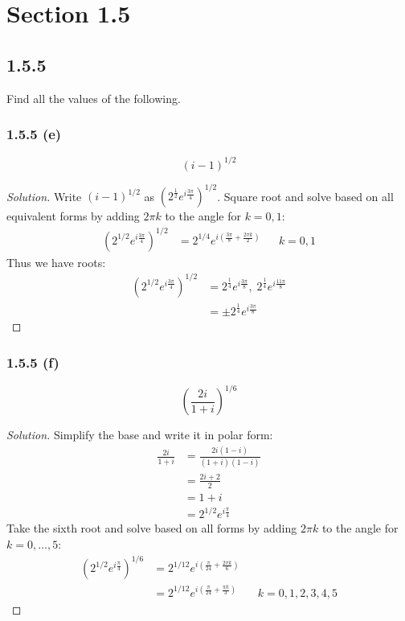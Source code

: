 \documentclass{article}
\newenvironment{solution}{
\begin{proof}[Solution]}{
\end{proof}}
\begin{document}
\section*{Section 1.5}

\subsection*{1.5.5}
Find all the values of the following.

\subsubsection*{1.5.5 (e)}
\[
  (i-1)^{1/2}
\]
\begin{solution}
  Write $(i-1)^{1/2}$ as $\left(2^{\frac{1}{2}}e^{i \frac{3\pi}{4}}\right)^{1/2}$.
  Square root and solve based on all equivalent forms by adding $2\pi k$ to the angle for $k=0,1$:
  \begin{align*}
    \left(2^{1/2} e^{i \frac{3\pi}{4}} \right)^{1/2}
    &= 2^{1/4} e^{i \left(\frac{3\pi}{8} + \frac{2\pi k}{2}\right)}
    && k = 0,1
  \end{align*}
  Thus we have roots:
  \begin{align*}
    \left(2^{1/2} e^{i \frac{3\pi}{4}} \right)^{1/2}
    &= 2^{\frac{1}{4}} e^{i \frac{3\pi}{8}},\; 2^{\frac{1}{4}} e^{i \frac{11\pi}{8}}
    \\ &= \pm 2^{\frac{1}{4}} e^{i \frac{3\pi}{8}}
  \end{align*}
\end{solution}

\subsubsection*{1.5.5 (f)}
\[
  \left(\frac{2i}{1+i}\right)^{1/6}
\]
\begin{solution}
  Simplify the base and write it in polar form:
  \begin{align*}
    \frac{2i}{1 + i}
    &= \frac{2i(1 - i)}{(1 + i)(1 - i)}
    \\ &= \frac{2i + 2}{2}
    \\ &= 1 + i
    \\ &= 2^{1/2} e^{i \frac{\pi}{4}}
  \end{align*}
  Take the sixth root and solve based on all forms by adding $2\pi k$ to the angle for $k=0,\dots,5$:
  \begin{align*}
    \left(2^{1/2} e^{i \frac{\pi}{4}} \right)^{1/6}
    &= 2^{1/12} e^{i \left(\frac{\pi}{24} + \frac{2\pi k}{6}\right)}
    \\ &= 2^{1/12} e^{i \left(\frac{\pi}{24} + \frac{\pi k}{3}\right)}
    && k = 0,1,2,3,4,5
  \end{align*}
\end{solution}
\end{document}
